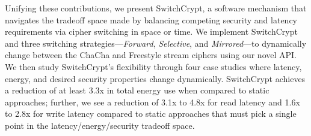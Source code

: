 Unifying these contributions, we present SwitchCrypt, a software mechanism that
navigates the tradeoff space made by balancing competing security and latency
requirements via cipher switching in space or time. We implement SwitchCrypt and
three switching strategies---\emph{Forward}, \emph{Selective}, and
\emph{Mirrored}---to dynamically change between the ChaCha and Freestyle stream
ciphers using our novel API. We then study SwitchCrypt's flexibility through
four case studies where latency, energy, and desired security properties change
dynamically. SwitchCrypt achieves a reduction of at least 3.3x in total energy
use when compared to static approaches; further, we see a reduction of 3.1x to
4.8x for read latency and 1.6x to 2.8x for write latency compared to static
approaches that must pick a single point in the latency/energy/security tradeoff
space.
